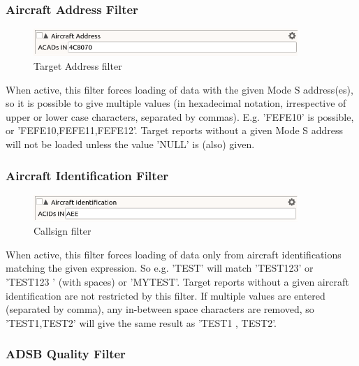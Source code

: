 \subsubsection{Aircraft Address Filter}

\begin{figure}[H]
  \center
    \includegraphics[width=10cm,frame]{figures/filter_acad.png}
  \caption{Target Address filter}
\end{figure}

When active, this filter forces loading of data with the given Mode S address(es), so it is possible to give multiple values (in hexadecimal notation, irrespective of upper or lower case characters, separated by commas). E.g. 'FEFE10' is possible, or 'FEFE10,FEFE11,FEFE12'. Target reports without a given Mode S address will not be loaded unless the value 'NULL' is (also) given.

\subsubsection{Aircraft Identification Filter}

\begin{figure}[H]
  \center
    \includegraphics[width=10cm,frame]{figures/filter_acid.png}
  \caption{Callsign filter}
\end{figure}

When active, this filter forces loading of data only from aircraft identifications matching the given expression. So e.g. 'TEST' will match 'TEST123' or 'TEST123   ' (with spaces) or 'MYTEST'. Target reports without a given aircraft identification are not restricted by this filter. If multiple values are entered (separated by comma), any in-between space characters are removed, so 'TEST1,TEST2' will give the same result as 'TEST1 , TEST2'.

\subsubsection{ADSB Quality Filter}

